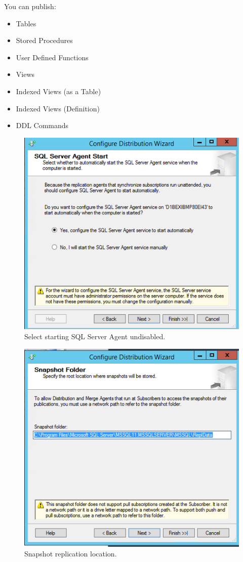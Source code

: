\documentclass[english]{article}
\begin{document}
You can publish:
\begin{itemize}
\item Tables
\item Stored Procedures
\item User Defined Functions
\item Views
\item Indexed Views (as a Table)
\item Indexed Views (Definition)
\item DDL Commands
\end{itemize}

\begin{figure}[H]
\centerline{\includegraphics[scale=1]{administration/rep/4}}
\caption{Select starting SQL Server Agent undisabled.}
\end{figure}

\begin{figure}[H]
\centerline{\includegraphics[scale=0.8]{administration/rep/5}}
\caption{Snapshot replication location.}
\end{figure}
\end{document}

